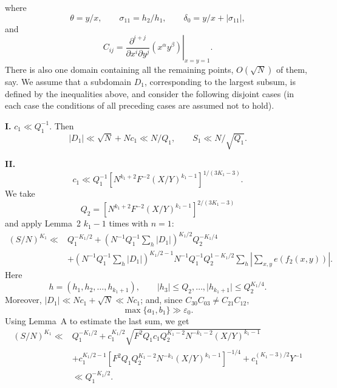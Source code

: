 \documentclass[10pt]{article}
\begin{document}
where
\[
  \theta=y/x,\qquad \sigma_{11}=h_2/h_1,\qquad
  \delta_0=y/x+\lvert\sigma_{11}\rvert,
\]
and
\[
  C_{ij}=\left.
  \frac{\partial^{i+j}}{\partial x^i\partial y^j}(x^\alpha y^\beta)
  \right|_{x=y=1}.
\]
There is also one domain containing all the remaining points, $O(\sqrt N)$ of them, say. We assume that a subdomain $D_1$, corresponding to the largest subsum, is defined by the inequalities above, and consider the following disjoint cases (in each case the conditions of all preceding cases are assumed not to hold).

\medskip
\noindent\textbf{I.} $c_1\ll Q_1^{-1}$. Then
\[
  \lvert D_1\rvert\ll\sqrt N+Nc_1\ll N/Q_1,
  \qquad S_1\ll N/\sqrt{Q_1}.
\]

\medskip
\noindent\textbf{II.}
\[
  c_1\ll Q_1^{-1}
  \left[N^{k_1+2}F^{-2}(X/Y)^{k_1-1}\right]^{1/(3K_1-3)}.
\]
We take
\[
  Q_2=\left[N^{k_1+2}F^{-2}(X/Y)^{k_1-1}\right]^{2/(3K_1-3)}
\]
and apply Lemma~2 $k_1-1$ times with $n=1$:
\[
\begin{aligned}
(S/N)^{K_1}\ll{}&Q_1^{-K_1/2}
 +\left(N^{-1}Q_1^{-1}\sum_h\lvert D_1\rvert\right)^{K_1/2}
  Q_2^{-K_1/4}\\
&+\left(N^{-1}Q_1^{-1}\sum_h\lvert D_1\rvert\right)^{K_1/2-1}
 N^{-1}Q_1^{-1}Q_2^{1-K_1/2}
 \sum_h\left\lvert\sum_{x,y}e(f_2(x,y))\right\rvert.
\end{aligned}
\]
Here
\[
  h=(h_1,h_2,\ldots,h_{k_1+1}),\qquad
  \lvert h_3\rvert\leqslant Q_2,\ldots,
  \lvert h_{k_1+1}\rvert\leqslant Q_2^{K_1/4}.
\]
Moreover, $\lvert D_1\rvert\ll Nc_1+\sqrt N\ll Nc_1$; and, since
$C_{30}C_{03}\ne C_{21}C_{12}$,
\[
  \max\{a_1,b_1\}\gg\varepsilon_0.
\]
Using Lemma~A to estimate the last sum, we get
\[
\begin{aligned}
(S/N)^{K_1}\ll{}&Q_1^{-K_1/2}
+c_1^{K_1/2}
 \sqrt{F^2Q_1c_1Q_2^{K_1-2}N^{-k_1-2}(X/Y)^{k_1-1}}\\
&+c_1^{K_1/2-1}
 \left[F^2Q_1Q_2^{K_1-2}N^{-k_1}(X/Y)^{k_1-1}\right]^{-1/4}
+c_1^{(K_1-3)/2}Y^{-1}\\
&\ll Q_1^{-K_1/2}.
\end{aligned}
\]
\end{document}
